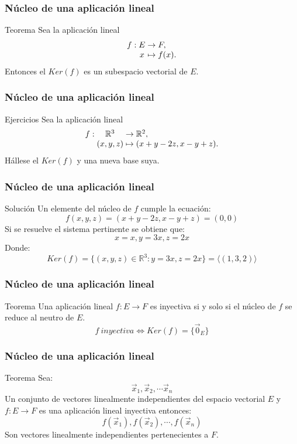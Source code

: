 \documentclass{beamer}
\begin{document}
\begin{frame}
  \frametitle{N\'ucleo de una aplicaci\'on lineal}
 \begin{block}{Teorema} 
Sea la aplicaci\'on lineal \[
  \begin{array}{@{}r@{\;}c@{\;}c@{\;}l@{}}
    f: & E & \rightarrow & F,   \\
       & x & \mapsto     & f(x).
  \end{array}
\] 
Entonces el $Ker(f)$ es un subespacio vectorial de $E$.
\end{block} 
 \end{frame}
 
 
\begin{frame}
  \frametitle{N\'ucleo de una aplicaci\'on lineal}
 \begin{block}{Ejercicios} 
Sea la aplicaci\'on lineal \[
  \begin{array}{@{}r@{\;}c@{\;}c@{\;}l@{}}
    f: & \mathbb R^3 & \rightarrow & \mathbb R^2,   \\
       & (x,y,z) & \mapsto     & (x+y-2z, x-y+z).
  \end{array}
\] 
H\'allese el $Ker(f)$ y una nueva base suya.
\end{block} 
 \end{frame}
 
 \begin{frame}
  \frametitle{N\'ucleo de una aplicaci\'on lineal}
 \begin{block}{Soluci\'on} 
Un elemente del n\'ucleo de $f$ cumple la ecuaci\'on:
 \[ f(x,y,z) = (x+y-2z, x-y+z)=(0,0)\] 
Si se resuelve el sistema pertinente se obtiene que:
\[x=x, y=3x, z=2x\]
Donde:
\[Ker(f) = \{(x,y,z)\in\mathbb R^3: y=3x, z=2x\} = \langle (1,3,2) \rangle\]
\end{block} 
 \end{frame}

\begin{frame}
  \frametitle{N\'ucleo de una aplicaci\'on lineal}
 \begin{block}{Teorema} 
Una aplicaci\'on lineal $f:E\rightarrow F$ es inyectiva si y solo si el n\'ucleo de $f$ se reduce al neutro de $E$.
\[f\ inyectiva \Longleftrightarrow Ker(f) = \{\vec 0_E\} \]
\end{block} 
 \end{frame}

\begin{frame}
\frametitle{N\'ucleo de una aplicaci\'on lineal}
\begin{block}{Teorema} 
Sea: 
\[\vec x_1, \vec x_2, \cdots \vec x_n\]
 Un conjunto de vectores linealmente independientes del espacio vectorial $E$ y $f:E\rightarrow F$ es una aplicaci\'on lineal inyectiva entonces: 
 \[f(\vec x_1), f(\vec x_2), \cdots, f(\vec x_n)\]
  Son vectores linealmente independientes pertenecientes a $F$. 
\end{block} 
 \end{frame}
\end{document}
